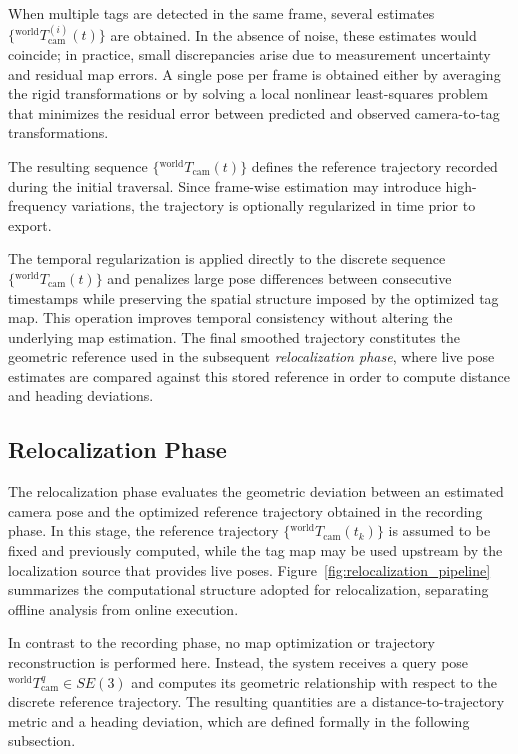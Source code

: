 \documentclass[a4paper,11pt]{article}
\begin{document}
When multiple tags are detected in the same frame, several estimates $\{{}^{\text{world}}\!T_{\text{cam}}^{(i)}(t)\}$ are obtained. In the absence of noise, these estimates would coincide; in practice, small discrepancies arise due to measurement uncertainty and residual map errors. A single pose per frame is obtained either by averaging the rigid transformations or by solving a local nonlinear least-squares problem that minimizes the residual error between predicted and observed camera-to-tag transformations.

The resulting sequence $\{{}^{\text{world}}\!T_{\text{cam}}(t)\}$ defines the reference trajectory recorded during the initial traversal. Since frame-wise estimation may introduce high-frequency variations, the trajectory is optionally regularized in time prior to export. 

The temporal regularization is applied directly to the discrete sequence $\{{}^{\text{world}}\!T_{\text{cam}}(t)\}$ and penalizes large pose differences between consecutive timestamps while preserving the spatial structure imposed by the optimized tag map. This operation improves temporal consistency without altering the underlying map estimation. The final smoothed trajectory constitutes the geometric reference used in the subsequent \textit{relocalization phase}, where live pose estimates are compared against this stored reference in order to compute distance and heading deviations.





\subsection{Relocalization Phase}
\label{subsec:relocalization_phase}

The relocalization phase evaluates the geometric deviation between an estimated camera pose and the optimized reference trajectory obtained in the recording phase. In this stage, the reference trajectory $\{{}^{\text{world}}\!T_{\text{cam}}(t_k)\}$ is assumed to be fixed and previously computed, while the tag map may be used upstream by the localization source that provides live poses. Figure~\ref{fig:relocalization_pipeline} summarizes the computational structure adopted for relocalization, separating offline analysis from online execution.

In contrast to the recording phase, no map optimization or trajectory reconstruction is performed here. Instead, the system receives a query pose ${}^{\text{world}}\!T_{\text{cam}}^{q} \in SE(3)$ and computes its geometric relationship with respect to the discrete reference trajectory. The resulting quantities are a distance-to-trajectory metric and a heading deviation, which are defined formally in the following subsection.
\end{document}
